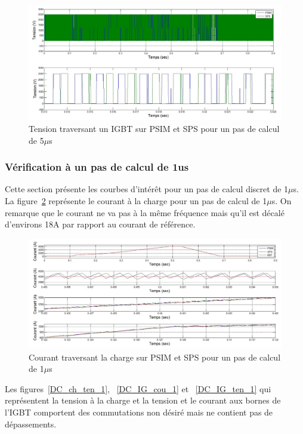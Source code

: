 \documentclass[11pt,letterpaper,final]{report}
\begin{document}
\begin{figure}[htb]
\centering
\includegraphics[scale=0.5]{Fig/DCPDCN/DCPTensionIGBT5u.jpg}
\caption{Tension traversant un IGBT sur PSIM et SPS pour un pas de calcul de 5$\mu$s}
\label{DC_IG_ten_5}
\end{figure}



\clearpage
\subsubsection{Vérification à un pas de calcul de 1us}
Cette section présente les courbes d'intérêt pour un pas de calcul discret de 1$\mu$s. La figure~\ref{DC_ch_cou_1} représente le courant à la charge pour un pas de calcul de 1$\mu$s. On remarque que le courant ne va pas à la même fréquence mais qu'il est décalé d'environs 18A par rapport au courant de référence.



\begin{figure}[htb]
\centering
\includegraphics[scale=0.5]{Fig/DCPDCN/DCPCourantCharge1u.jpg}
\caption{Courant traversant la charge sur PSIM et SPS pour un pas de calcul de 1$\mu$s}
\label{DC_ch_cou_1}
\end{figure}

Les figures~\ref{DC_ch_ten_1}, ~\ref{DC_IG_cou_1} et ~\ref{DC_IG_ten_1} qui représentent la tension à la charge et la tension et le courant aux bornes de l'IGBT comportent des commutations non désiré mais ne contient pas de dépassements.
\end{document}
